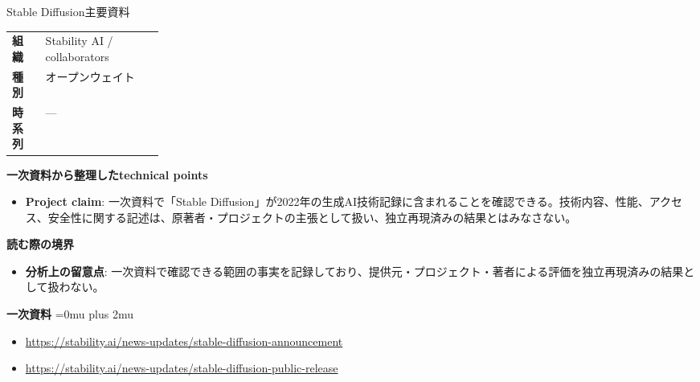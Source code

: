 \begin{technicalnote}{Stable Diffusion}{主要資料}
\begingroup
\begin{tabularx}{\linewidth}{@{}>{\bfseries}p{0.22\linewidth}X@{}}
組織 & Stability AI / collaborators \\
種別 & オープンウェイト \\
時系列 & — \\
\end{tabularx}
\smallskip
{\bfseries 一次資料から整理したtechnical points}
\begin{itemize}[leftmargin=1.5em,itemsep=0.35em]
\item \textbf{Project claim}: 一次資料で「Stable Diffusion」が2022年の生成AI技術記録に含まれることを確認できる。技術内容、性能、アクセス、安全性に関する記述は、原著者・プロジェクトの主張として扱い、独立再現済みの結果とはみなさない。
\end{itemize}
\begin{minipage}{\linewidth}
{\bfseries 読む際の境界}
\begin{itemize}[leftmargin=1.5em,itemsep=0.35em]
\item \textbf{分析上の留意点}: 一次資料で確認できる範囲の事実を記録しており、提供元・プロジェクト・著者による評価を独立再現済みの結果として扱わない。
\end{itemize}
\begin{samepage}
{\bfseries 一次資料}
\begingroup\sloppy
\Urlmuskip=0mu plus 2mu\relax
\begin{itemize}[leftmargin=1.5em,itemsep=0.25em]
\item {\scriptsize\url{https://stability.ai/news-updates/stable-diffusion-announcement}}
\item {\scriptsize\url{https://stability.ai/news-updates/stable-diffusion-public-release}}
\end{itemize}
\endgroup
\end{samepage}
\end{minipage}
\endgroup
\end{technicalnote}
\medskip

